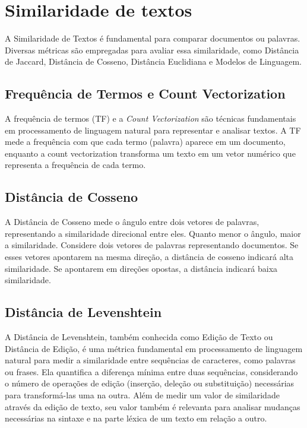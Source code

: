 \section{Similaridade de textos}
A Similaridade de Textos é fundamental para comparar documentos ou palavras. Diversas métricas são empregadas para avaliar essa similaridade, como Distância de Jaccard, Distância de Cosseno, Distância Euclidiana e Modelos de Linguagem.

\subsection{Frequência de Termos e Count Vectorization}

A frequência de termos (TF) e a \textit{Count Vectorization} são técnicas fundamentais em processamento de linguagem natural para representar e analisar textos. A TF mede a frequência com que cada termo (palavra) aparece em um documento, enquanto a count vectorization transforma um texto em um vetor numérico que representa a frequência de cada termo.

\subsection{Distância de Cosseno}
A Distância de Cosseno mede o ângulo entre dois vetores de palavras, representando a similaridade direcional entre eles. Quanto menor o ângulo, maior a similaridade. Considere dois vetores de palavras representando documentos. Se esses vetores apontarem na mesma direção, a distância de cosseno indicará alta similaridade. Se apontarem em direções opostas, a distância indicará baixa similaridade.

\subsection{Distância de Levenshtein}
A Distância de Levenshtein, também conhecida como Edição de Texto ou Distância de Edição, é uma métrica fundamental em processamento de linguagem natural para medir a similaridade entre sequências de caracteres, como palavras ou frases. Ela quantifica a diferença mínima entre duas sequências, considerando o número de operações de edição (inserção, deleção ou substituição) necessárias para transformá-las uma na outra. Além de medir um valor de similaridade através da edição de texto, seu valor também é relevanta para analisar mudanças necessárias na sintaxe e na parte léxica de um texto em relação a outro.

